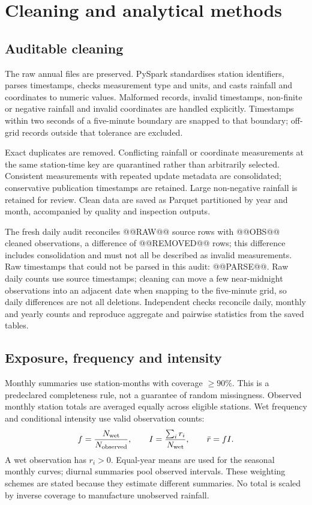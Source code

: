 \documentclass[10pt,a4paper]{article}
\begin{document}
\clearpage
\section{Cleaning and analytical methods}
\subsection{Auditable cleaning}
The raw annual files are preserved. PySpark standardises station identifiers, parses timestamps, checks measurement type and units, and casts rainfall and coordinates to numeric values. Malformed records, invalid timestamps, non-finite or negative rainfall and invalid coordinates are handled explicitly. Timestamps within two seconds of a five-minute boundary are snapped to that boundary; off-grid records outside that tolerance are excluded.

Exact duplicates are removed. Conflicting rainfall or coordinate measurements at the same station-time key are quarantined rather than arbitrarily selected. Consistent measurements with repeated update metadata are consolidated; conservative publication timestamps are retained. Large non-negative rainfall is retained for review. Clean data are saved as Parquet partitioned by year and month, accompanied by quality and inspection outputs.

The fresh daily audit reconciles @@RAW@@ source rows with @@OBS@@ cleaned observations, a difference of @@REMOVED@@ rows; this difference includes consolidation and must not all be described as invalid measurements. Raw timestamps that could not be parsed in this audit: @@PARSE@@. Raw daily counts use source timestamps; cleaning can move a few near-midnight observations into an adjacent date when snapping to the five-minute grid, so daily differences are not all deletions. Independent checks reconcile daily, monthly and yearly counts and reproduce aggregate and pairwise statistics from the saved tables.

\subsection{Exposure, frequency and intensity}
Monthly summaries use station-months with coverage $\geq90\%$. This is a predeclared completeness rule, not a guarantee of random missingness. Observed monthly station totals are averaged equally across eligible stations. Wet frequency and conditional intensity use valid observation counts:
\[
 f=\frac{N_{\rm wet}}{N_{\rm observed}},\qquad
 I=\frac{\sum_i r_i}{N_{\rm wet}},\qquad \bar r=fI.
\]
A wet observation has $r_i>0$. Equal-year means are used for the seasonal monthly curves; diurnal summaries pool observed intervals. These weighting schemes are stated because they estimate different summaries. No total is scaled by inverse coverage to manufacture unobserved rainfall.
\end{document}
